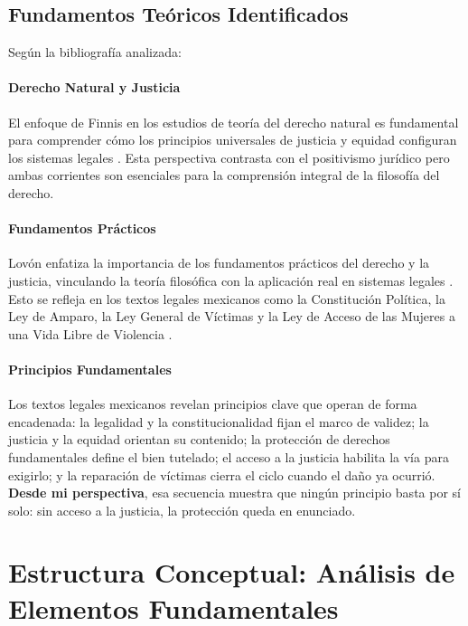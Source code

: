 \documentclass[
	spanish, %
	letterpaper, oneside
]{article}
\begin{document}
\subsection{Fundamentos Teóricos Identificados}

Según la bibliografía analizada:

\paragraph{Derecho Natural y Justicia}
El enfoque de Finnis en los estudios de teoría del derecho natural es fundamental para comprender cómo los principios universales de justicia y equidad configuran los sistemas legales \cite{finnisEstudiosTeoriaDerecho2017}. Esta perspectiva contrasta con el positivismo jurídico pero ambas corrientes son esenciales para la comprensión integral de la filosofía del derecho.

\paragraph{Fundamentos Prácticos}
Lovón enfatiza la importancia de los fundamentos prácticos del derecho y la justicia, vinculando la teoría filosófica con la aplicación real en sistemas legales \cite{lovonManualPracticoFilosofia2020}. Esto se refleja en los textos legales mexicanos como la Constitución Política, la Ley de Amparo, la Ley General de Víctimas y la Ley de Acceso de las Mujeres a una Vida Libre de Violencia \cite{cpeum2026,LeyAmparoReglamentaria,LeyGeneralVictimas,franzoniacevedoLeyGeneralAcceso2017}.

\paragraph{Principios Fundamentales}
Los textos legales mexicanos revelan principios clave que operan de forma encadenada: la legalidad y la constitucionalidad fijan el marco de validez; la justicia y la equidad orientan su contenido; la protección de derechos fundamentales define el bien tutelado; el acceso a la justicia habilita la vía para exigirlo; y la reparación de víctimas cierra el ciclo cuando el daño ya ocurrió. \textbf{Desde mi perspectiva}, esa secuencia muestra que ningún principio basta por sí solo: sin acceso a la justicia, la protección queda en enunciado.
\section{Estructura Conceptual: Análisis de Elementos Fundamentales}
\end{document}
